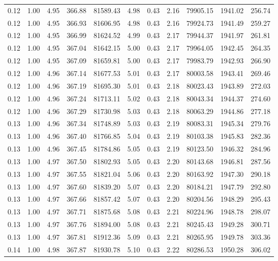 \begin{table}[!ht]
\begin{tabular}{rrrrrrrrrrr}
0.12 & 1.00 & 4.95 & 366.88 & 81589.43 & 4.98 & 0.43 & 2.16 & 79905.15 & 1941.02 & 256.74 \\
0.12 & 1.00 & 4.95 & 366.93 & 81606.95 & 4.98 & 0.43 & 2.16 & 79924.73 & 1941.49 & 259.27 \\
0.12 & 1.00 & 4.95 & 366.99 & 81624.52 & 4.99 & 0.43 & 2.17 & 79944.37 & 1941.97 & 261.81 \\
0.12 & 1.00 & 4.95 & 367.04 & 81642.15 & 5.00 & 0.43 & 2.17 & 79964.05 & 1942.45 & 264.35 \\
0.12 & 1.00 & 4.95 & 367.09 & 81659.81 & 5.00 & 0.43 & 2.17 & 79983.79 & 1942.93 & 266.90 \\
0.12 & 1.00 & 4.96 & 367.14 & 81677.53 & 5.01 & 0.43 & 2.17 & 80003.58 & 1943.41 & 269.46 \\
0.12 & 1.00 & 4.96 & 367.19 & 81695.30 & 5.01 & 0.43 & 2.18 & 80023.43 & 1943.89 & 272.03 \\
0.12 & 1.00 & 4.96 & 367.24 & 81713.11 & 5.02 & 0.43 & 2.18 & 80043.34 & 1944.37 & 274.60 \\
0.12 & 1.00 & 4.96 & 367.29 & 81730.98 & 5.03 & 0.43 & 2.18 & 80063.29 & 1944.86 & 277.18 \\
0.13 & 1.00 & 4.96 & 367.34 & 81748.89 & 5.03 & 0.43 & 2.19 & 80083.31 & 1945.34 & 279.76 \\
0.13 & 1.00 & 4.96 & 367.40 & 81766.85 & 5.04 & 0.43 & 2.19 & 80103.38 & 1945.83 & 282.36 \\
0.13 & 1.00 & 4.96 & 367.45 & 81784.86 & 5.05 & 0.43 & 2.19 & 80123.50 & 1946.32 & 284.96 \\
0.13 & 1.00 & 4.97 & 367.50 & 81802.93 & 5.05 & 0.43 & 2.20 & 80143.68 & 1946.81 & 287.56 \\
0.13 & 1.00 & 4.97 & 367.55 & 81821.04 & 5.06 & 0.43 & 2.20 & 80163.92 & 1947.30 & 290.18 \\
0.13 & 1.00 & 4.97 & 367.60 & 81839.20 & 5.07 & 0.43 & 2.20 & 80184.21 & 1947.79 & 292.80 \\
0.13 & 1.00 & 4.97 & 367.66 & 81857.42 & 5.07 & 0.43 & 2.20 & 80204.56 & 1948.29 & 295.43 \\
0.13 & 1.00 & 4.97 & 367.71 & 81875.68 & 5.08 & 0.43 & 2.21 & 80224.96 & 1948.78 & 298.07 \\
0.13 & 1.00 & 4.97 & 367.76 & 81894.00 & 5.08 & 0.43 & 2.21 & 80245.43 & 1949.28 & 300.71 \\
0.13 & 1.00 & 4.97 & 367.81 & 81912.36 & 5.09 & 0.43 & 2.21 & 80265.95 & 1949.78 & 303.36 \\
0.14 & 1.00 & 4.98 & 367.87 & 81930.78 & 5.10 & 0.43 & 2.22 & 80286.53 & 1950.28 & 306.02 \\

\end{tabular}
\end{table}
